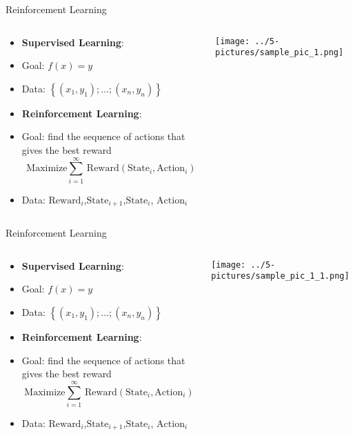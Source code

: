 \documentclass[11pt]{beamer}
\begin{document}
\begin{frame}{Reinforcement Learning}
\begin{columns}[T] %
\begin{column}{.48\textwidth}
        \begin{itemize}
		\item \textbf{Supervised Learning}:
		\item Goal: $f(x)=y$
		\item Data: $\left\{ (x_1,y_1);\dots;(x_n,y_n)\right\}$
		\item \textbf{Reinforcement Learning}:
		\item Goal: find the sequence of actions that gives the best reward \footnotesize $$\text{Maximize} \sum\limits_{i=1}^\infty \, \text{Reward}(\text{State}_i, \text{Action}_i)$$ \normalsize
		\item Data: $\text{Reward}_i$,$\text{State}_{i+1}$,$\text{State}_i$, $\text{Action}_i$
        \end{itemize}
\end{column}%
\hfill%
\begin{column}{.48\textwidth}
        \texttt{[image: ../5-pictures/sample\_pic\_1.png]}
\end{column}%
\end{columns}
\end{frame}
\begin{frame}{Reinforcement Learning}
\begin{columns}[T] %
\begin{column}{.48\textwidth}
        \begin{itemize}
		\item \textbf{Supervised Learning}:
		\item Goal: $f(x)=y$
		\item Data: $\left\{ (x_1,y_1);\dots;(x_n,y_n)\right\}$
		\item \textbf{Reinforcement Learning}:
		\item Goal: find the sequence of actions that gives the best reward \footnotesize $$\text{Maximize} \sum\limits_{i=1}^\infty \, \text{Reward}(\text{State}_i, \text{Action}_i)$$ \normalsize
		\item Data: $\text{Reward}_i$,$\text{State}_{i+1}$,$\text{State}_i$, $\text{Action}_i$
        \end{itemize}
\end{column}%
\hfill%
\begin{column}{.48\textwidth}
        \texttt{[image: ../5-pictures/sample\_pic\_1\_1.png]}
\end{column}%
\end{columns}
\end{frame}
\end{document}
